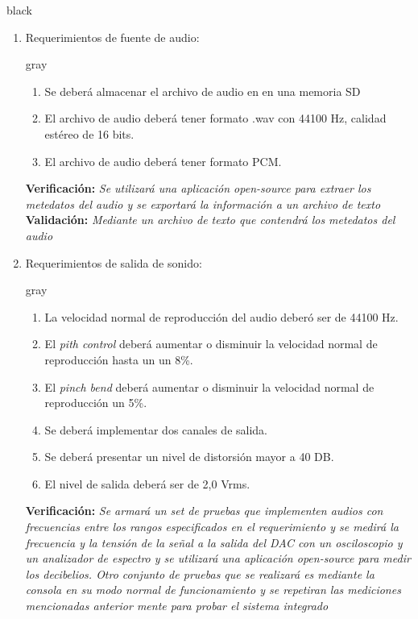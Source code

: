 \documentclass[11pt]{charter}
\begin{document}
\begin{consigna}{black}
\begin{enumerate}
\begin{consigna}{gray}
\begin{enumerate}
	\item Deberá tener un potenciómetro lineal para el ajuste permanente de velocidad.	
	\end{enumerate}
	\end{consigna}
	\textbf{Verificación:} \textit{Análisis visual} \newline                                                                              
	\newline 
	\textbf{Validación:} \textit{Análisis visual}
\item Requerimientos de fuente de audio:
	\begin{consigna}{gray}
	\begin{enumerate}
	\item Se deberá almacenar el archivo de audio en en una memoria SD
	\item El archivo de audio deberá tener formato .wav con 44100 Hz, calidad estéreo de 16 bits.
	\item El archivo de audio deberá tener formato PCM.
	\end{enumerate}
	\end{consigna}
	\textbf{Verificación:} \textit{Se utilizará una aplicación \textit{open-source} para extraer los metedatos del audio y se exportará la información a un archivo de texto} \newline                                                                              
	\textbf{Validación:} \textit{Mediante un archivo de texto que contendrá los metedatos del audio}
\item Requerimientos de salida de sonido:
	\begin{consigna}{gray}
	\begin{enumerate}
	\item La velocidad normal de reproducción del audio deberó ser de 44100 Hz.
	\item El \textit{pith control} deberá aumentar o disminuir la velocidad normal de reproducción hasta un un 8\%.
	\item El \textit{pinch bend} deberá aumentar o disminuir la velocidad normal de reproducción un 5\%.
	\item Se deberá implementar dos canales de salida.
	\item Se deberá presentar un nivel de distorsión mayor a 40 DB.
	\item El nivel de salida deberá ser de 2,0 Vrms.
	\end{enumerate}
	\end{consigna}
	\textbf{Verificación:} \textit{Se armará un set de pruebas que implementen audios con frecuencias entre los rangos especificados en el requerimiento y se medirá la frecuencia y la tensión de la señal a la salida del DAC con un osciloscopio y  un analizador de espectro y se utilizará una aplicación \textit{open-source} para medir los decibelios. Otro conjunto de pruebas que se realizará es mediante la consola en su modo normal de funcionamiento y se repetiran las mediciones mencionadas anterior mente para probar el sistema integrado} \newline                                                                              

\end{enumerate}
\end{consigna}
\end{document}
